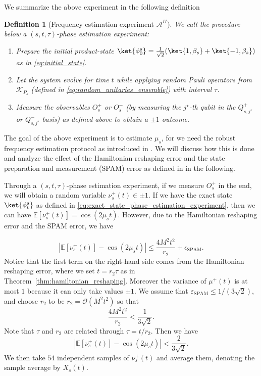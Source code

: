 \documentclass[twocolumn,superscriptaddress,aps,showpacs,amsmath,amstex,amssymb,citeautoscript,floatfix,pra,preprintnumbers]{revtex4-2}
\theoremstyle{plain}
\theoremstyle{plain}
\theoremstyle{plain}
\theoremstyle{plain}
\theoremstyle{plain}
\theoremstyle{plain}
\newtheorem{defn}{Definition}
\begin{document}
\begin{appendix}
We summarize the above experiment in the following definition
\begin{defn}[Frequency estimation experiment $\mathcal{A}^{II}$]
\label{def:phase_estimation_experiment}
    We call the procedure below a $(s,t,\tau)$-phase estimation experiment:
    \begin{enumerate}
        \item Prepare the initial product-state $\ket{\phi^s_0}=\frac{1}{\sqrt{2}}(\ket{1,\beta_s} + \ket{-1,\beta_s})$ as in \eqref{eq:initial_state}.
        \item Let the system evolve for time $t$ while applying random Pauli operators from $\mathcal{K}_{P_s}$ (defined in \eqref{eq:random_unitaries_ensemble}) with interval $\tau$.
        \item Measure the observables $O^+_s$ or $O^-_s$ (by measuring the $j^\star$-th qubit in the $Q^+_{s,j^\star}$ or $Q^-_{s,j^\star}$ basis) as defined above to obtain a $\pm 1$ outcome.
    \end{enumerate}
\end{defn}
The goal of the above experiment is to estimate $\mu_s$, for we need the robust frequency estimation protocol as introduced in . We will discuss how this is done and analyze the effect of the Hamiltonian reshaping error and the state preparation and measurement (SPAM) error as defined in  in the following.

Through a $(s,t,\tau)$-phase estimation experiment, if we measure $O^+_s$ in the end, we will obtain a random variable $\nu_s^+(t)\in{\pm 1}$. If we have the exact  state $\ket{\phi^s_t}$ as defined in \eqref{eq:exact_state_phase_estimation_experiment}, then we can have $\mathbb{E}[\nu_s^+(t)] = \cos(2\mu_s t)$. However, due to the Hamiltonian reshaping error and the SPAM error, we have

\begin{equation}
\label{eq:phase_estimation_experiment_expectation_deviation}
    |\mathbb{E}[\nu_s^+(t)]-\cos(2\mu_s t)|\leq \frac{4M^2 t^2}{r_2} + \epsilon_{\mathrm{SPAM}}.
\end{equation}
Notice that the first term on the right-hand side comes from the Hamiltonian reshaping error, where we set $t=r_2\tau$ as in Theorem~\ref{thm:hamiltonian_reshaping}. Moreover the variance of $\mu^+(t)$ is at most $1$ because it can only take values $\pm 1$.
We assume that $\varepsilon_{\mathrm{SPAM}}\leq 1/(3\sqrt{2})$, and choose $r_2$ to be $r_2= \mathcal{O}(M^2 t^2)$ so that 
\[
\frac{4M^2 t^2}{r_2} < \frac{1}{3\sqrt{2}}.
\]
Note that $\tau$ and $r_2$ are related through $\tau=t/r_2$.
Then we have
\[
|\mathbb{E}[\nu_s^+(t)]-\cos(2\mu_s t)| < \frac{2}{3\sqrt{2}}.
\]
We then take $54$ independent samples of $\nu_s^+(t)$ and average them, denoting the sample average by $X_s(t)$. 


\end{appendix}
\end{document}
